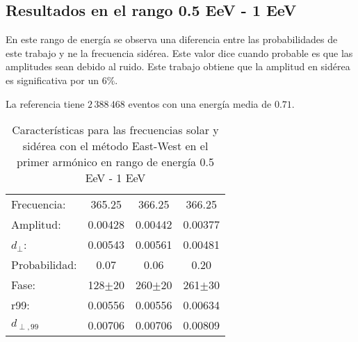 \subsection*{Resultados en el rango 0.5 EeV - 1 EeV}
En este rango de energía se observa una diferencia entre las probabilidades de este trabajo y \cite{Aab_2020}  ne la frecuencia sidérea. Este valor dice cuando probable es que las amplitudes sean debido al ruido. Este trabajo obtiene que la amplitud en sidérea es significativa por un  $6\%$.

La referencia tiene $2\,388\,468$ eventos con una energía media de $0.71$.

\begin{table}[H]
        \begin{small}
            \begin{center}
                \begin{tabular}[c]{l|c||c|c}
                    Frecuencia:     & 365.25	    & 366.25		& 366.25\cite{Aab_2020}\\
                    Amplitud:       & 0.00428       & 0.00442	    & 0.00377\\
                    $d_\perp$:      & 0.00543       & 0.00561       & 0.00481\\
                    Probabilidad:   & 0.07          & 0.06	        & 0.20\\
                    Fase:           & 128$\pm$20	& 260$\pm$20	& 261$\pm$30\\
                    r99:            & 0.00556	    & 0.00556       & 0.00634\\
                    $d_{\perp,99}$  & 0.00706       & 0.00706       &0.00809\\
                \end{tabular}
            \end{center}
        \end{small}
        \caption{Características para las frecuencias solar y sidérea con el método East-West en el primer armónico en rango de energía 0.5 EeV - 1 EeV}
        \label{tab:solar}
    \end{table}


